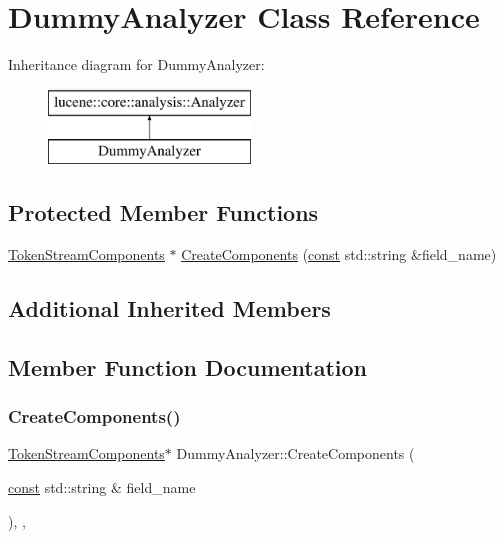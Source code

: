 \hypertarget{classDummyAnalyzer}{}\section{Dummy\+Analyzer Class Reference}
\label{classDummyAnalyzer}
Inheritance diagram for Dummy\+Analyzer\+:\begin{figure}[H]
\begin{center}
\leavevmode
\includegraphics[height=2.000000cm]{classDummyAnalyzer}
\end{center}
\end{figure}
\subsection*{Protected Member Functions}
\begin{DoxyCompactItemize}
\item 
\mbox{\hyperlink{classlucene_1_1core_1_1analysis_1_1TokenStreamComponents}{Token\+Stream\+Components}} $\ast$ \mbox{\hyperlink{classDummyAnalyzer_aeeb24aa6449d4bf7c4adc6a5c63a5c0e}{Create\+Components}} (\mbox{\hyperlink{ZlibCrc32_8h_a2c212835823e3c54a8ab6d95c652660e}{const}} std\+::string \&field\+\_\+name)
\end{DoxyCompactItemize}
\subsection*{Additional Inherited Members}


\subsection{Member Function Documentation}
\mbox{\label{classDummyAnalyzer_aeeb24aa6449d4bf7c4adc6a5c63a5c0e}} 
\subsubsection{\texorpdfstring{Create\+Components()}{CreateComponents()}}
{\footnotesize\ttfamily \mbox{\hyperlink{classlucene_1_1core_1_1analysis_1_1TokenStreamComponents}{Token\+Stream\+Components}}$\ast$ Dummy\+Analyzer\+::\+Create\+Components (\begin{DoxyParamCaption}\item[{\mbox{\hyperlink{ZlibCrc32_8h_a2c212835823e3c54a8ab6d95c652660e}{const}} std\+::string \&}]{field\+\_\+name }\end{DoxyParamCaption})\hspace{0.3cm}{\ttfamily [inline]}, {\ttfamily [protected]}, {\ttfamily [virtual]}}



